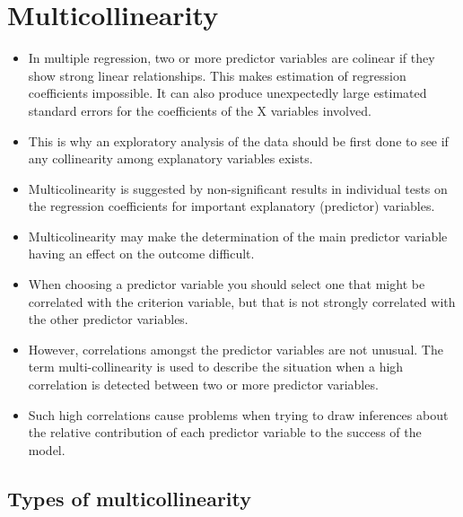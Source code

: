 \documentclass[a4paper,12pt]{article}
\begin{document}
\section{Multicollinearity}
\begin{itemize}
	\item In multiple regression, two or more predictor variables are colinear if they show strong linear relationships. This makes estimation of regression coefficients impossible. It can also produce unexpectedly large estimated standard errors for the coefficients of the X variables involved.
	\item This is why an exploratory analysis of the data should be first done to see if any collinearity among explanatory variables exists.
	
	
	\item Multicolinearity is suggested by non-significant results in individual tests on the regression coefficients for important explanatory (predictor) variables. \item Multicolinearity may make the determination of the main predictor variable having an effect on the outcome difficult.
\end{itemize}


\begin{itemize}
	\item When choosing a predictor variable you should select one that might be correlated with the criterion variable, but that is not strongly correlated with the other predictor variables.
	\item However, correlations amongst the predictor variables are not unusual. The term multi-collinearity  is used to describe the situation
	when a high correlation is detected between two or more predictor variables.
	\item Such high correlations cause problems when trying to draw inferences about the relative contribution of each predictor variable to the success of the model.
\end{itemize} 



	
	\subsection{Types of multicollinearity}
	
	
\end{document}
